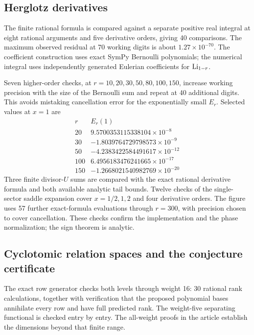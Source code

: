 \subsection{Herglotz derivatives}

The finite rational formula is compared against a separate positive
real integral at eight rational arguments and five derivative orders,
giving 40 comparisons. The maximum observed residual at 70 working
digits is about \(1.27\times10^{-70}\).
The coefficient construction uses exact SymPy Bernoulli polynomials;
the numerical integral uses independently generated Eulerian
coefficients for \(\operatorname{Li}_{1-r}\).

Seven higher-order checks, at \(r=10,20,30,50,80,100,150\), increase
working precision with the size of the Bernoulli sum and repeat at
40 additional digits. This avoids mistaking cancellation error for
the exponentially small \(E_r\). Selected values at \(x=1\) are
\[
\begin{array}{r|r}
 r&E_r(1)\\ \hline
 20& 9.5700353115338104\times10^{-8}\\
 30&-1.8039764729798573\times10^{-9}\\
 50&-4.2383422584491617\times10^{-12}\\
 100&6.4956183476241665\times10^{-17}\\
 150&-1.2668021540982769\times10^{-20}
\end{array}
\]
Three finite divisor-\(U\) sums are compared with the exact rational
derivative formula and both available analytic tail bounds.
Twelve checks of the single-sector saddle expansion cover
\(x=1/2,1,2\) and four derivative orders. The figure uses 57 further
exact-formula evaluations through \(r=300\), with precision chosen
to cover cancellation. These checks confirm the implementation and
the phase normalization; the sign theorem is analytic.

\subsection{Cyclotomic relation spaces and the conjecture certificate}

The exact row generator checks both levels through weight 16:
30 rational rank calculations, together with verification that
the proposed polynomial bases annihilate every row and have full
predicted rank. The weight-five separating functional is checked
entry by entry. The all-weight proofs in the article establish the
dimensions beyond that finite range.

